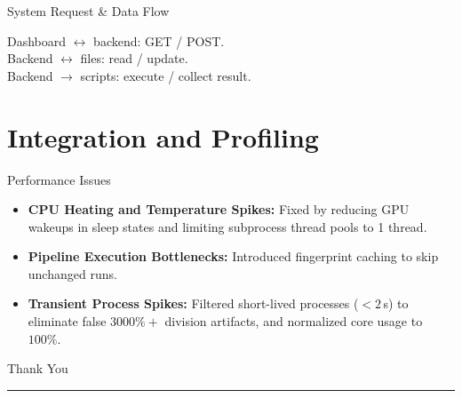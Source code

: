 \documentclass[aspectratio=169,10pt]{beamer}
\begin{document}
\begin{frame}{System Request \& Data Flow}

\vspace{2mm}
\footnotesize
Dashboard $\leftrightarrow$ backend: GET / POST.\\
Backend $\leftrightarrow$ files: read / update. \\
Backend $\rightarrow$ scripts: execute / collect result.
\end{frame}

\section{Integration and Profiling}

\begin{frame}{Performance Issues}
    \begin{itemize}
        \setlength{\itemsep}{8pt}
        \item \textbf{CPU Heating and Temperature Spikes:} Fixed by reducing GPU wakeups in sleep states and limiting subprocess thread pools to 1 thread.
        \item \textbf{Pipeline Execution Bottlenecks:} Introduced fingerprint caching to skip unchanged runs.
        \item \textbf{Transient Process Spikes:} Filtered short-lived processes ($<2$\,s) to eliminate false $3000\%+$ division artifacts, and normalized core usage to $100\%$.
    \end{itemize}
\end{frame}
\begin{frame}[plain]
    \centering
    \vfill
    {\color{ChampagneLight}\fontsize{24}{29}\selectfont Thank You\par}
    \vspace{0.28cm}
    {\color{Violet}\rule{0.12\linewidth}{1.1pt}\par}
    \vfill
\end{frame}
\end{document}
